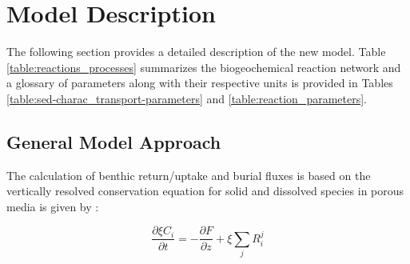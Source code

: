 \documentclass[gmd, manuscript]{copernicus}
\begin{document}
\section{Model Description}
The following section provides a detailed description of the new model. Table \ref{table:reactions_processes} summarizes the biogeochemical reaction network and 
a glossary of parameters along with their respective units is provided in Tables \ref{table:sed-charac_transport-parameters} and \ref{table:reaction_parameters}.

\subsection {General Model Approach} \label{subsec:GeneralModelApproach}
The calculation of benthic return/uptake and burial fluxes is based on the vertically resolved conservation equation for solid and dissolved species in porous media is given by 
\citep[e.g.][]{berner_early_1980, boudreau1997diagenetic}:

\begin{equation} 
\frac{\partial \xi C_i}{\partial t}=-\frac{\partial F}{\partial z}+\xi \sum_j R_i^j \label{eq:Eq_generaldiagenetic}
\end{equation}
\end{document}
